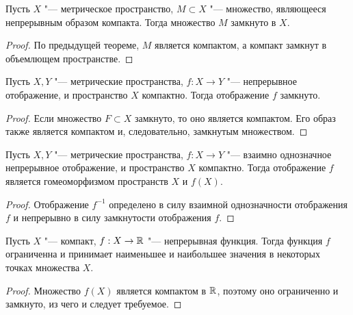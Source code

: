 \begin{corollary}
    Пусть $X$ "--- метрическое пространство, $M \subset X$ "--- множество, являющееся непрерывным образом компакта. Тогда множество $M$ замкнуто в $X$.
\end{corollary}

\begin{proof}
    По предыдущей теореме, $M$ является компактом, а компакт замкнут в объемлющем пространстве.
\end{proof}

\begin{corollary}
    Пусть $X, Y$ "--- метрические пространства, $f : X \to Y$ "--- непрерывное отображение, и пространство $X$ компактно. Тогда отображение $f$ замкнуто.
\end{corollary}

\begin{proof}
    Если множество $F \subset X$ замкнуто, то оно является компактом. Его образ также является компактом и, следовательно, замкнутым множеством.
\end{proof}

\begin{theorem}
    Пусть $X, Y$ "--- метрические пространства, $f : X \to Y$ "--- взаимно однозначное непрерывное отображение, и пространство $X$ компактно. Тогда отображение $f$ является гомеоморфизмом пространств $X$ и $f(X)$.
\end{theorem}

\begin{proof}
    Отображение $f^{-1}$ определено в силу взаимной однозначности отображения $f$ и непрерывно в силу замкнутости отображения $f$.
\end{proof}

\begin{theorem}
    Пусть $X$ "--- компакт, $f : X \to \mathbb{R}$ "--- непрерывная функция. Тогда функция $f$ ограниченна и принимает наименьшее и наибольшее значения в некоторых точках множества $X$.
\end{theorem}

\begin{proof}
    Множество $f(X)$ является компактом в $\mathbb{R}$, поэтому оно ограниченно и замкнуто, из чего и следует требуемое.
\end{proof}
